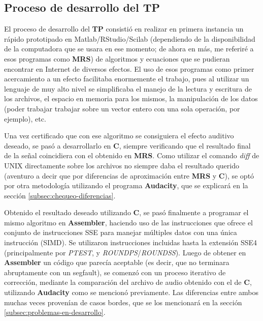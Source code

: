 \subsection{Proceso de desarrollo del TP}
\label{subsec:intro-desarrollo}
El proceso de desarrollo del \textbf{TP} consistió en realizar en primera instancia un rápido prototipado en Matlab/RStudio/Scilab (dependiendo de la disponibilidad de la computadora que se usara en ese momento; de ahora en más, me referiré a esos programas como \textbf{MRS}) de algoritmos y ecuaciones que se pudieran encontrar en Internet de diversos efectos. El uso de esos programas como primer acercamiento a un efecto facilitaba enormemente el trabajo, pues al utilizar un lenguaje de muy alto nivel se simplificaba el manejo de la lectura y escritura de los archivos, el espacio en memoria para los mismos, la manipulación de los datos (poder trabajar trabajar sobre un vector entero con una sola operación, por ejemplo), etc.\vspace{\baselineskip}

Una vez certificado que con ese algoritmo se consiguiera el efecto auditivo deseado, se pasó a desarrollarlo en \textbf{C}, siempre verificando que el resultado final de la señal coincidiera con el obtenido en \textbf{MRS}. Como utilizar el comando \textit{diff} de UNIX directamente sobre los archivos no siempre daba el resultado querido (aventuro a decir que por diferencias de aproximación entre \textbf{MRS} y \textbf{C}), se optó por otra metodología utilizando el programa \textbf{Audacity}, que se explicará en la sección \ref{subsec:chequeo-diferencias}.\vspace{\baselineskip}

Obtenido el resultado deseado utilizando \textbf{C}, se pasó finalmente a programar el mismo algoritmo en \textbf{Assembler}, haciendo uso de las instrucciones que ofrece el conjunto de instrucciones SSE para manejar múltiples datos con una única instrucción (SIMD). Se utilizaron instrucciones incluidas hasta la extensión SSE4 (principalmente por \textit{PTEST}, y \textit{ROUNDPS}/\textit{ROUNDSS}). Luego de obtener en \textbf{Assembler} un código que parecía aceptable (es decir, que no terminara abruptamente con un segfault), se comenzó con un proceso iterativo de corrección, mediante la comparación del archivo de audio obtenido con el de \textbf{C}, utilizando \textbf{Audacity} como se mencionó previamente. Las diferencias entre ambos muchas veces provenían de casos bordes, que se los mencionará en la sección \ref{subsec:problemas-en-desarrollo}.\vspace{\baselineskip}

